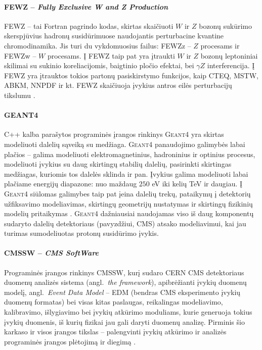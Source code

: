 \documentclass[a4paper, 12pt]{article}
\begin{document}
\paragraph{FEWZ -- \textit{Fully Exclusive W and Z Production}\\}
FEWZ -- tai Fortran pagrindo kodas, skirtas skaičiuoti $W$ ir $Z$ bozonų sukūrimo skerspjūvius hadronų susidūrimuose naudojantis perturbacine kvantine chromodinamika. Jis turi du vykdomuosius failus: FEWZz -- $Z$ procesams ir FEWZw -- $W$ procesams. Į FEWZ taip pat yra įtraukti $W$ ir $Z$ bozonų leptoniniai skilimai su sukinio koreliacijomis, baigtinio pločio efektai, bei $\gamma Z$ interferencija. Į FEWZ yra įtrauktos tokios partonų pasiskirstymo funkcijos, kaip CTEQ, MSTW, ABKM, NNPDF ir kt. FEWZ skaičiuoja įvykius antros eilės perturbacijų tikslumu \cite{fewz}.

\paragraph{GEANT4\\}
C++ kalba parašytos programinės įrangos rinkinys \textsc{Geant4} yra skirtas modeliuoti dalelių sąveiką su medžiaga. \textsc{Geant4} panaudojimo galimybės labai plačios -- galima modeliuoti elektromagnetinius, hadroninius ir optinius procesus, modeliuoti įvykius su daug skirtingų stabilių dalelių, pasirinkti skirtingas medžiagas, kuriomis tos dalelės sklinda ir pan. Įvykius galima modeliuoti labai plačiame energijų diapazone: nuo maždaug $250$ eV iki kelių TeV ir daugiau. Į \textsc{Geant4} siūlomas galimybes taip pat įeina dalelių trekų, pataikymų į detektorių užfiksavimo modeliavimas, skirtingų geometrijų nustatymas ir skirtingų fizikinių modelių pritaikymas \cite{geant4}. \textsc{Geant4} dažniausiai naudojamas viso iš daug komponentų sudaryto dalelių detektoriaus (pavyzdžiui, CMS) atsako modeliavimui, kai jau turimas sumodeliuotas protonų susidūrimo įvykis.

\paragraph{CMSSW -- \textit{CMS SoftWare}\\}
Programinės įrangos rinkinys CMSSW, kurį sudaro CERN CMS detektoriaus duomenų analizės sistema (angl.\ \textit{the framework}), apibrėžianti įvykių duomenų modelį, angl.\ \textit{Event Data Model} -- EDM (bendras CMS eksperimento įvykių duomenų formatas) bei visas kitas paslaugas, reikalingas modeliavimo, kalibravimo, išlygiavimo bei įvykių atkūrimo moduliams, kurie generuoja tokius įvykių duomenis, iš kurių fizikai jau gali daryti duomenų analizę. Pirminis šio karkaso ir visos įrangos tikslas -- palengvinti įvykių atkūrimo ir analizės programinės įrangos plėtojimą ir diegimą \cite{cmsswtwiki}.
\end{document}
